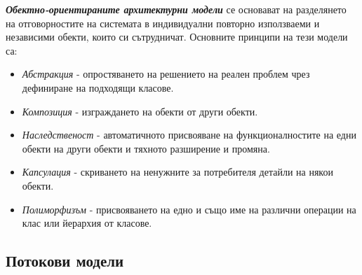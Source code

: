\documentclass[fleqn,12pt]{article}
\begin{document}
\textbf{\textit{Обектно-ориентираните архитектурни модели}} се основават на разделянето на отговорностите на системата в индивидуални повторно използваеми и независими обекти, които си сътрудничат.
Основните принципи на тези модели са:
\begin{itemize}
    \item \textit{Абстракция} - опростяването на решението на реален проблем чрез дефиниране на подходящи класове.
    \item \textit{Композиция} - изграждането на обекти от други обекти.
    \item \textit{Наследственост} - автоматичното присвояване на функционалностите на едни обекти на други обекти и тяхното разширение и промяна.
    \item \textit{Капсулация} - скриването на ненужните за потребителя детайли на някои обекти.
    \item \textit{Полиморфизъм} - присвояването на едно и също име на различни операции на клас или йерархия от класове.
\end{itemize}

\subsection{Потокови модели}
\end{document}
